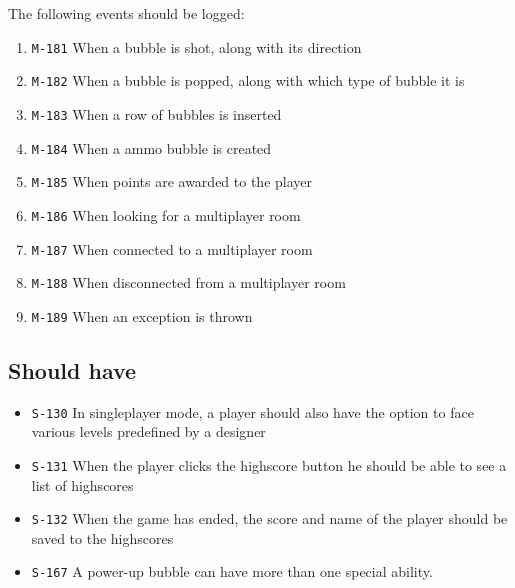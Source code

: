 \documentclass[a4paper]{article}
\begin{document}
\begin{itemize}
  	The following events should be logged:
  
        \begin{enumerate}
          \item \texttt{M-181} When a bubble is shot, along with its direction
          \item \texttt{M-182} When a bubble is popped, along with which type of bubble it is
          \item \texttt{M-183} When a row of bubbles is inserted
          \item \texttt{M-184} When a ammo bubble is created
          \item \texttt{M-185} When points are awarded to the player
          \item \texttt{M-186} When looking for a multiplayer room
          \item \texttt{M-187} When connected to a multiplayer room
          \item \texttt{M-188} When disconnected from a multiplayer room
          \item \texttt{M-189} When an exception is thrown
      \end{enumerate}
      

\end{itemize}

\subsection{Should have}

\begin{itemize}
      \item \texttt{S-130} In singleplayer mode, a player should also have the option to face various levels predefined by a designer
      \item \texttt{S-131} When the player clicks the highscore button he should be able to see a list of highscores
      \item \texttt{S-132} When the game has ended, the score and name of the player should be saved to the highscores
      \item \texttt{S-167} A power-up bubble can have more than one special ability.
\end{itemize}
\end{document}
